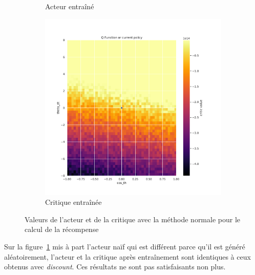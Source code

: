 \begin{figure}[H]
\begin{subfigure}{0.3\textwidth}
        \caption{Acteur entraîné}
    \end{subfigure}
    \begin{subfigure}{0.3\textwidth}
        \includegraphics[width=\textwidth]{figures/iteration1/0_critic_normalize_post_Pendulum-v0.pdf}
        \caption{Critique entraînée}
    \end{subfigure}
    \caption{Valeurs de l'acteur et de la critique avec la méthode normale pour le calcul de la récompense}
    \label{fig:attempt1_normalize}
\end{figure}

Sur la figure~\ref{fig:attempt1_normalize} mis à part l'acteur naïf qui est différent parce qu'il est généré aléatoirement, l'acteur et la critique après entraînement sont identiques à ceux obtenus avec \emph{discount}. Ces résultats ne sont pas satisfaisants non plus.

